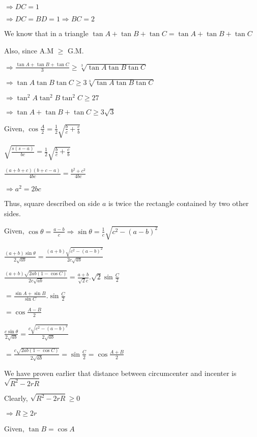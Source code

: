   $\Rightarrow DC = 1$

  $\Rightarrow DC = BD = 1 \Rightarrow BC = 2$

\item We know that in a triangle $\tan A + \tan B + \tan C = \tan A + \tan B + \tan C$

  Also, since A.M $\geq$ G.M.

  $\Rightarrow \frac{\tan A + \tan B + \tan C}{3}\geq \sqrt[3]{\tan A\tan B\tan C}$

  $\Rightarrow \tan A\tan B\tan C\geq 3\sqrt[3]{\tan A\tan B\tan C}$

  $\Rightarrow \tan^2A\tan^2B\tan^2C\geq 27$

  $\Rightarrow \tan A + \tan B + \tan C\geq 3\sqrt{3}$

\item Given, $\cos\frac{A}{2} = \frac{1}{2}\sqrt{\frac{b}{c} + \frac{c}{b}}$

  $\sqrt{\frac{s(s - a)}{bc}} = \frac{1}{2}\sqrt{\frac{b}{c} + \frac{c}{b}}$

  $\frac{(a + b + c)(b + c - a)}{4bc} = \frac{b^2 + c^2}{4bc}$

  $\Rightarrow a^2 = 2bc$

  Thus, square described on side $a$ is twice the rectangle contained by two other sides.

\item Given, $\cos\theta = \frac{a - b}{c} \Rightarrow \sin\theta = \frac{1}{c}\sqrt{c^2 - (a - b)^2}$

  $\frac{(a + b)\sin\theta}{2\sqrt{ab}} = \frac{(a + b)\sqrt{c^2 - (a - b)^2}}{2c\sqrt{ab}}$

  $\frac{(a + b)\sqrt{2ab(1 - \cos C)}}{2c\sqrt{ab}} = \frac{a + b}{\sqrt{2}c}.\sqrt{2}\sin\frac{C}{2}$

  $= \frac{\sin A + \sin B}{\sin C}.\sin\frac{C}{2}$

  $= \cos\frac{A - B}{2}$

  $\frac{c\sin\theta}{2\sqrt{ab}} = \frac{c\sqrt{c^2 - (a - b)^2}}{2\sqrt{ab}}$

  $= \frac{c\sqrt{2ab(1 - \cos C)}}{2\sqrt{ab}} = \sin \frac{C}{2} = \cos \frac{A + B}{2}$

\item We have proven earlier that distance between circumcenter and incenter is $\sqrt{R^2 - 2rR}$

  Clearly, $\sqrt{R^2 - 2rR}\geq 0$

  $\Rightarrow R\geq 2r$

\item Given, $\tan B = \cos A$

